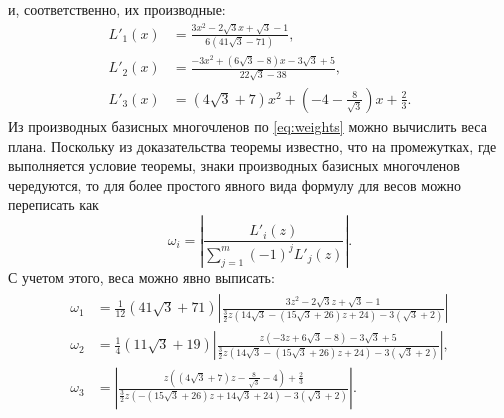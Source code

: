 \documentclass[specialist,
               substylefile = spbu.rtx,
               subf,href,colorlinks=true, 12pt]{disser}
\theoremstyle{definition}
\newcommand\abs[1]{\left\lvert#1\right\rvert}
\begin{document}
	и, соответственно, их производные:
	\begin{align*}
		L'_1(x) &= \frac{3 x^2-2 \sqrt{3} x+\sqrt{3}-1}{6 \left(41 \sqrt{3}-71\right)}, \\
		L'_2(x) &= \frac{-3 x^2+\left(6 \sqrt{3}-8\right) x-3 \sqrt{3}+5}{22 \sqrt{3}-38}, \\
		L'_3(x) &= \left(4 \sqrt{3}+7\right) x^2+\left(-4-\frac{8}{\sqrt{3}}\right) x+\frac{2}{3}.
	\end{align*}
	Из производных базисных многочленов по \eqref{eq:weights} можно вычислить веса плана. Поскольку из доказательства теоремы известно, что на промежутках, где выполняется условие теоремы, знаки производных базисных многочленов чередуются, то для более простого явного вида формулу для весов можно переписать как
	\begin{equation*}
		\omega_i = \abs{\frac{L'_i(z)}{\sum_{j=1}^m (-1)^j L'_j(z)}}.
	\end{equation*}
	С учетом этого, веса можно явно выписать:
	\begin{align}
	\label{eq:ex:w}
	\begin{split}
		\omega_1 &= \frac{1}{12} \left(41 \sqrt{3}+71\right) \left| \frac{3 z^2-2 \sqrt{3} z+\sqrt{3}-1}{\frac{3}{2} z \left(14 \sqrt{3}-\left(15 \sqrt{3}+26\right) z+24\right)-3 \left(\sqrt{3}+2\right)}\right| \\
		\omega_2 &=  \frac{1}{4} \left(11 \sqrt{3}+19\right) \left| \frac{z \left(-3 z+6 \sqrt{3}-8\right)-3 \sqrt{3}+5}{\frac{3}{2} z \left(14 \sqrt{3}-\left(15 \sqrt{3}+26\right) z+24\right)-3 \left(\sqrt{3}+2\right)}\right|, \\
		\omega_3 &= \left| \frac{z \left(\left(4 \sqrt{3}+7\right) z-\frac{8}{\sqrt{3}}-4\right)+\frac{2}{3}}{\frac{3}{2} z \left(-\left(15 \sqrt{3}+26\right) z+14 \sqrt{3}+24\right)-3 \left(\sqrt{3}+2\right)}\right|.
	\end{split}
	\end{align}
	
\end{document}
